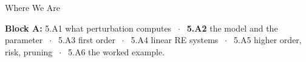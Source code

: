 

\graphicspath{{./figures/}}





\makedecktitle

\begin{frame}{Where We Are}
\vspace{-1mm}
\begin{center}
\small \textbf{Block A:} 5.A1 what perturbation computes $\;\cdot\;$ \textbf{5.A2} the model and the parameter $\;\cdot\;$ 5.A3 first order $\;\cdot\;$ 5.A4 linear RE systems $\;\cdot\;$ 5.A5 higher order, risk, pruning $\;\cdot\;$ 5.A6 the worked example.
\end{center}
\end{frame}

